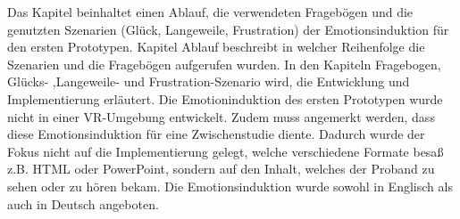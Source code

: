 
Das Kapitel beinhaltet einen Ablauf, die verwendeten Frageb{\"o}gen und die genutzten Szenarien (Gl{\"u}ck, Langeweile, Frustration) der Emotionsinduktion f{\"u}r den ersten Prototypen. 
Kapitel Ablauf beschreibt in welcher Reihenfolge die Szenarien und die Frageb{\"o}gen aufgerufen wurden. 
In den Kapiteln Fragebogen, Gl{\"u}cks- ,Langeweile- und Frustration-Szenario wird, die Entwicklung und Implementierung erl{\"a}utert. 
Die Emotioninduktion des ersten Prototypen wurde nicht in einer VR-Umgebung entwickelt. 
Zudem muss angemerkt werden, dass diese Emotionsinduktion f{\"u}r eine Zwischenstudie diente. 
Dadurch wurde der Fokus nicht auf die Implementierung gelegt, welche verschiedene Formate besa{\ss} z.B. HTML oder PowerPoint, sondern auf den Inhalt, welches der Proband zu sehen oder zu h{\"o}ren bekam.
Die Emotionsinduktion wurde sowohl in Englisch als auch in Deutsch angeboten.







